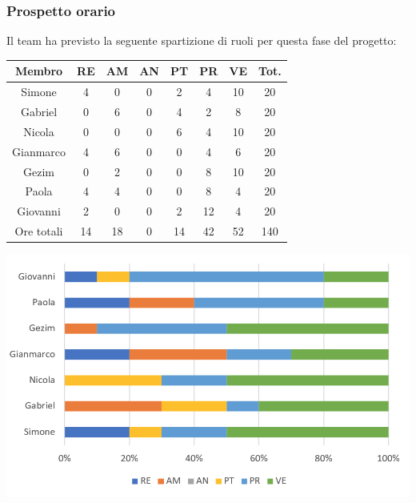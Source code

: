 \subsubsection{Prospetto orario}
Il team ha previsto la seguente spartizione di ruoli per questa fase del progetto:
\\
\begin{center}
\begin{tabular}{ |c|c|c|c|c|c|c|c|  }
 \hline
 Membro 		& RE 	& AM 	& AN 	& PT 	& PR 	& VE 	& Tot.\\
 \hline\hline
 Simone			& 4 		& 0		& 0 	& 2 		& 4 		& 10 		& 20\\
 Gabriel		& 0 		& 6 		& 0 	& 4		& 2 		& 8 		& 20\\
 Nicola			& 0 		& 0 		& 0 	& 6 		& 4 		& 10 		& 20\\
 Gianmarco		& 4 		& 6 		& 0 	& 0	 	& 4 		& 6 		& 20\\
 Gezim			& 0 		& 2 		& 0 	& 0 		& 8 		& 10	 	& 20\\
 Paola			& 4 		& 4 		& 0 	& 0 		& 8 		& 4 		& 20\\
 Giovanni		& 2 		& 0	 	& 0 	& 2 		& 12 	& 4  	& 20\\
 \hline\hline
 Ore totali		& 14		& 18		& 0 	& 14	 	& 42 	& 52 	& 140\\
  \hline
\end{tabular}
\end{center}
\includegraphics[width=\textwidth]{res/img/hi5}
\\
